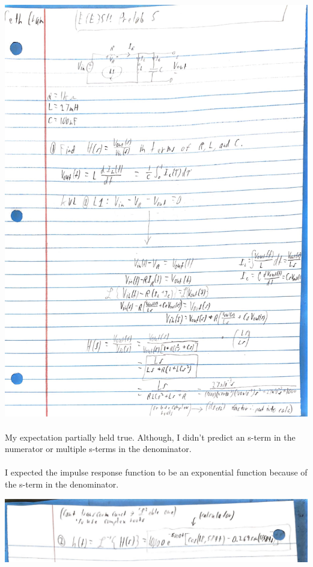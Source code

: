 \documentclass[12pt]{report}
\begin{document}
    \includegraphics[scale=0.15]{EB56ECFA-E791-46BE-ACBF-A6EA65DBC192.jpeg}
    
    \paragraph{} My expectation partially held true. Although, I didn't predict an s-term in the numerator or multiple s-terms in the denominator. 

    \paragraph{} I expected the impulse response function to be an exponential function because of the s-term in the denominator. 

    \includegraphics[scale=0.15]{B2D35933-62AD-46D5-A15F-ED4A113534AF.jpeg}
\end{document}
